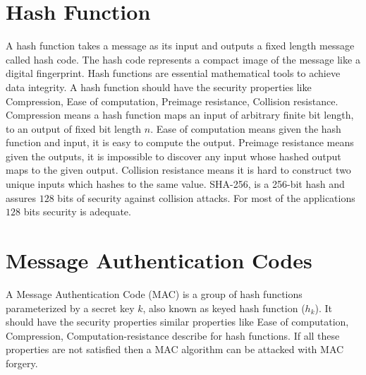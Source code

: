 \section{Hash Function}
	A hash function takes a message as its input and outputs a fixed length message called hash code.
	The hash code represents a compact image of the message like a digital fingerprint.
	Hash functions are essential mathematical tools to achieve data integrity.
	A hash function should have the security properties like Compression, Ease of computation, Preimage resistance, Collision resistance.
	Compression means a hash function maps an input of arbitrary finite bit length, to an output of fixed bit length $n$.
	Ease of computation means given the hash function and input, it is easy to compute the output.
	Preimage resistance means given the outputs, it is impossible to discover any input whose hashed output maps to the given output.
	Collision resistance means it is hard to construct two unique inputs which hashes to the same value.
	SHA-256, is a 256-bit hash and assures $128$ bits of security against collision attacks\cite{SHA256}.
	For most of the applications $128$ bits security is adequate.

\section{Message Authentication Codes}
	A Message Authentication Code (MAC) is a group of hash functions parameterized by a secret key $k$, also known as keyed hash function ($h_{k}$).
	It should have the security properties similar properties like Ease of computation, Compression, Computation-resistance describe for hash functions. 
	If all these properties are not satisfied then a MAC algorithm can be attacked with MAC forgery.

